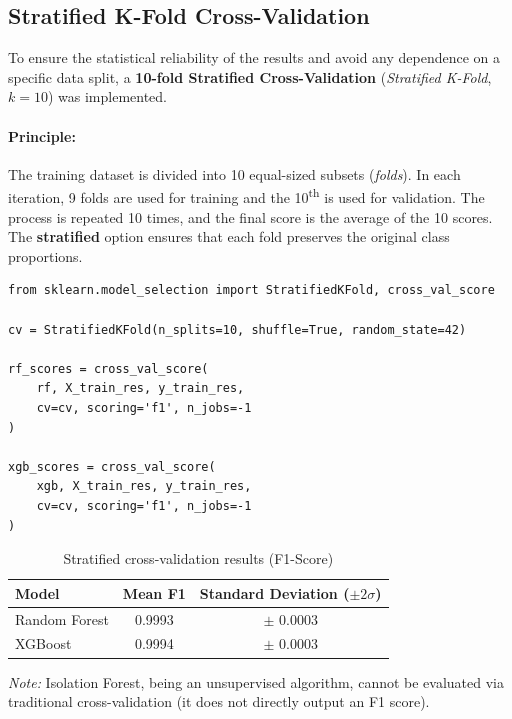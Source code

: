 \subsection{Stratified K-Fold Cross-Validation}

To ensure the statistical reliability of the results and avoid any dependence on a specific data split, a \textbf{10-fold Stratified Cross-Validation} (\textit{Stratified K-Fold}, $k=10$) was implemented.

\paragraph{Principle:} The training dataset is divided into 10 equal-sized subsets (\textit{folds}). In each iteration, 9 folds are used for training and the 10\textsuperscript{th} is used for validation. The process is repeated 10 times, and the final score is the average of the 10 scores. The \textbf{stratified} option ensures that each fold preserves the original class proportions.

\begin{lstlisting}[caption={10-Fold Stratified Cross-Validation}]
from sklearn.model_selection import StratifiedKFold, cross_val_score

cv = StratifiedKFold(n_splits=10, shuffle=True, random_state=42)

rf_scores = cross_val_score(
    rf, X_train_res, y_train_res,
    cv=cv, scoring='f1', n_jobs=-1
)

xgb_scores = cross_val_score(
    xgb, X_train_res, y_train_res,
    cv=cv, scoring='f1', n_jobs=-1
)
\end{lstlisting}

\begin{table}[H]
\centering
\caption{Stratified cross-validation results (F1-Score)}
\label{tab:cv_results}
\begin{tabular}{lcc}
\toprule
\textbf{Model} & \textbf{Mean F1} & \textbf{Standard Deviation ($\pm 2\sigma$)} \\
\midrule
Random Forest & 0.9993 & $\pm$ 0.0003 \\
XGBoost & 0.9994 & $\pm$ 0.0003 \\
\bottomrule
\end{tabular}
\end{table}

\noindent \textit{Note:} Isolation Forest, being an unsupervised algorithm, cannot be evaluated via traditional cross-validation (it does not directly output an F1 score).

